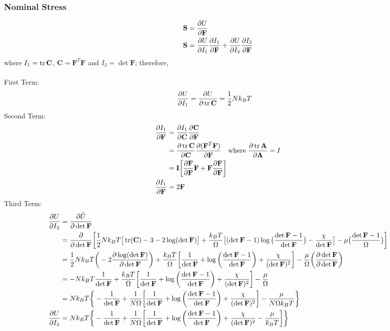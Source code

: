 \documentclass[12pt,3p]{article}
\numberwithin{equation}{section}
\begin{document}
\subsubsection{Nominal Stress}
\begin{align*}
\mathbf{S} &= \pdv{U}{\mathbf{F}} \\
\mathbf{S} &= \pdv{U}{I_1} \pdv{I_1}{\mathbf{F}} + \pdv{U}{I_3} \pdv{I_3}{\mathbf{F}} 
\end{align*}
where $I_1 = \tr \mathbf{C}$, $\mathbf{C} = \mathbf{F}^T \mathbf{F}$ and $I_3 = \det \mathbf{F}$; therefore, \\ \\ 
First Term:
\begin{align*}
\pdv{U}{I_1} &= \pdv{U}{\tr \mathbf{C}} = \frac{1}{2} N k_B T 
\end{align*}
Second Term:
\begin{align*}
\pdv{I_1}{\mathbf{F}} &= \pdv{I_1}{\mathbf{C}} \pdv{\mathbf{C}}{\mathbf{F}} \\
				&= \pdv{\tr \mathbf{C}}{\mathbf{C}} \pdv{(\mathbf{F}^T \mathbf{F})}{\mathbf{F}} \quad \text{where } \pdv{\tr \mathbf{A}}{\mathbf{A}} = I \\
			&= \mathbf{I} \bigg[ \pdv{\mathbf{F}}{\mathbf{F}} \mathbf{F} + \mathbf{F} \pdv{\mathbf{F}}{\mathbf{F}} \bigg] \\
\pdv{I_1}{\mathbf{F}} &= 2 \mathbf{F}
\end{align*}
Third Term:
\begin{align*}
\pdv{U}{I_3} &= \pdv{\hat{U}}{\det \mathbf{F}} \\
			&= \pdv{}{\det \mathbf{F}} \bigg[ \frac{1}{2} N k_B T \big[ \tr (\mathbf{C}) - 3 - 2 \log (\det \mathbf{F}) \big] + \frac{k_B T}{\Omega} \big[ (\det \mathbf{F} - 1) \log \big( \frac{\det \mathbf{F} - 1}{\det \mathbf{F}} \big) - \frac{\chi}{\det \mathbf{F}} \big] - \mu \big(\frac{\det \mathbf{F} - 1}{\Omega} \big) \bigg] \\
			&= \frac{1}{2} N k_B T \bigg(-2 \pdv{\log (\det \mathbf{F})}{\det \mathbf{F}} \bigg) + \frac{k_B T}{\Omega} \bigg[ \frac{1}{\det \mathbf{F}} + \log \bigg( \frac{\det \mathbf{F} - 1}{\det \mathbf{F}} \bigg) + \frac{\chi}{(\det \mathbf{F})^2} \bigg] - \frac{\mu}{\Omega} \bigg( \pdv{\det \mathbf{F}}{\det \mathbf{F}} \bigg)\\
			&= - N k_B T \frac{1}{\det \mathbf{F}} + \frac{k_B T}{\Omega} \bigg[ \frac{1}{\det \mathbf{F}} + \log \bigg( \frac{\det \mathbf{F} - 1}{\det \mathbf{F}} \bigg) + \frac{\chi}{(\det \mathbf{F})^2} \bigg] - \frac{\mu}{\Omega} \\
			&= N k_B T \bigg\{- \frac{1}{\det \mathbf{F}} + \frac{1}{N \Omega} \bigg[ \frac{1}{\det \mathbf{F}} + \log \bigg( \frac{\det \mathbf{F} - 1}{\det \mathbf{F}} \bigg) + \frac{\chi}{(\det \mathbf{F})^2} \bigg] - \frac{\mu}{N \Omega k_B T} \bigg\} \\
\pdv{U}{I_3} &= N k_B T \bigg\{- \frac{1}{\det \mathbf{F}} + \frac{1}{N \Omega} \bigg[ \frac{1}{\det \mathbf{F}} + \log \bigg( \frac{\det \mathbf{F} - 1}{\det \mathbf{F}} \bigg) + \frac{\chi}{(\det \mathbf{F})^2} - \frac{\mu}{k_B T} \bigg] \bigg\} 
\end{align*}
\end{document}
